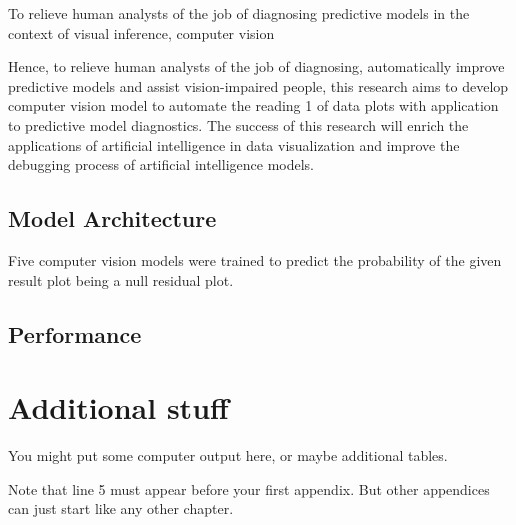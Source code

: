 \documentclass{monashthesis}
\theoremstyle{definition}
\theoremstyle{definition}
\theoremstyle{definition}
\theoremstyle{definition}
\theoremstyle{remark}
\begin{document}
To relieve human analysts of the job of diagnosing predictive models in the context of visual inference, computer vision

Hence, to relieve human analysts of the job of diagnosing, automatically improve predictive models and assist vision-impaired people, this research aims to develop computer vision model to automate the reading
1
of data plots with application to predictive model diagnostics. The success of this research will enrich the applications of artificial intelligence in data visualization and improve the debugging process of artificial intelligence models.

\hypertarget{model-architecture}{%
\section{Model Architecture}\label{model-architecture}}

Five computer vision models were trained to predict the probability of the given result plot being a null residual plot.

\hypertarget{performance}{%
\section{Performance}\label{performance}}

\appendix

\hypertarget{additional-stuff}{%
\chapter{Additional stuff}\label{additional-stuff}}

You might put some computer output here, or maybe additional tables.

Note that line 5 must appear before your first appendix. But other appendices can just start like any other chapter.

\printbibliography[heading=bibintoc]
\end{document}
